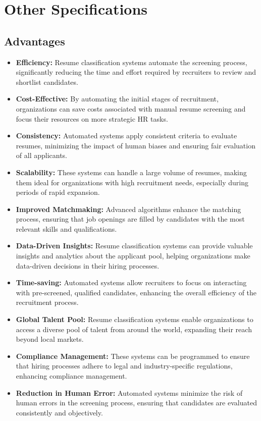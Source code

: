 \chapter{Other Specifications}

\section{Advantages}
\begin{itemize}
    \item \textbf{Efficiency:} Resume classification systems automate the screening process, significantly reducing the time and effort required by recruiters to review and shortlist candidates.
    \item \textbf{Cost-Effective:} By automating the initial stages of recruitment, organizations can save costs associated with manual resume screening and focus their resources on more strategic HR tasks.
    \item \textbf{Consistency:} Automated systems apply consistent criteria to evaluate resumes, minimizing the impact of human biases and ensuring fair evaluation of all applicants.
    \item \textbf{Scalability:} These systems can handle a large volume of resumes, making them ideal for organizations with high recruitment needs, especially during periods of rapid expansion.
    \item \textbf{Improved Matchmaking:} Advanced algorithms enhance the matching process, ensuring that job openings are filled by candidates with the most relevant skills and qualifications.
    \item \textbf{Data-Driven Insights:} Resume classification systems can provide valuable insights and analytics about the applicant pool, helping organizations make data-driven decisions in their hiring processes.
    \item \textbf{Time-saving:} Automated systems allow recruiters to focus on interacting with pre-screened, qualified candidates, enhancing the overall efficiency of the recruitment process.
    \item \textbf{Global Talent Pool:} Resume classification systems enable organizations to access a diverse pool of talent from around the world, expanding their reach beyond local markets.
    \item \textbf{Compliance Management:} These systems can be programmed to ensure that hiring processes adhere to legal and industry-specific regulations, enhancing compliance management.
    \item \textbf{Reduction in Human Error:} Automated systems minimize the risk of human errors in the screening process, ensuring that candidates are evaluated consistently and objectively.

\end{itemize}
